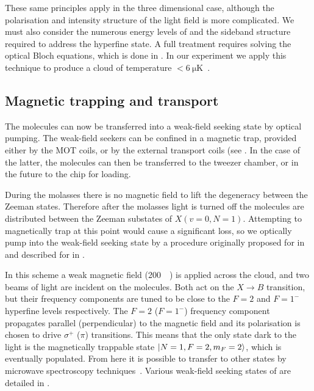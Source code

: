 These same principles apply in the three dimensional case, although the
polarisation and intensity structure of the light field is more complicated.
We must also consider the numerous energy levels of \CaF{} and the sideband
structure required to address the hyperfine state. A full treatment requires
solving the optical Bloch equations, which is done in
. In our experiment we apply this technique
to produce a \CaF{} cloud of temperature
$<\SI{6}{\micro\kelvin}$~\cite{PhysRevLett.123.033202}.

\subsection{Magnetic trapping and transport}

The molecules can now be transferred into a weak-field seeking state by optical
pumping. The weak-field seekers can be confined in a magnetic trap, provided
either by the MOT coils, or by the external transport coils (see
. In the case of the
latter, the molecules can then be transferred to the tweezer chamber, or in the
future to the chip for loading.

During the molasses there is no magnetic field to lift the degeneracy between
the Zeeman states. Therefore after the molasses light is turned off the
molecules are distributed between the Zeeman substates of $X(v=0, N=1)$.
Attempting to magnetically trap at this point would cause a significant loss,
so we optically pump into the weak-field seeking state by a procedure originally
proposed for \SrF{} in  %
and described for \CaF{} in .

In this scheme a weak magnetic field (\SI{200}{\milli\gauss}) is applied across
the cloud, and two beams of light are incident on the molecules. Both act on
the $X\rightarrow B$ transition, but their frequency components are tuned to be
close to the $F=2$ and $F=1^-$ hyperfine levels respectively. The $F=2$
($F=1^-$) frequency component propagates parallel (perpendicular) to the
magnetic field and its polarisation is chosen to drive $\sigma^+$ ($\pi$)
transitions. This means that the only state dark to the light is the
magnetically trappable state $\ket{N=1, F=2, m_F=2}$, which is eventually
populated. From here it is possible to transfer to other states by microwave
spectroscopy techniques~\cite{WilliamsMagnetic2018}. Various weak-field seeking
states of \CaF{} are detailed in .

